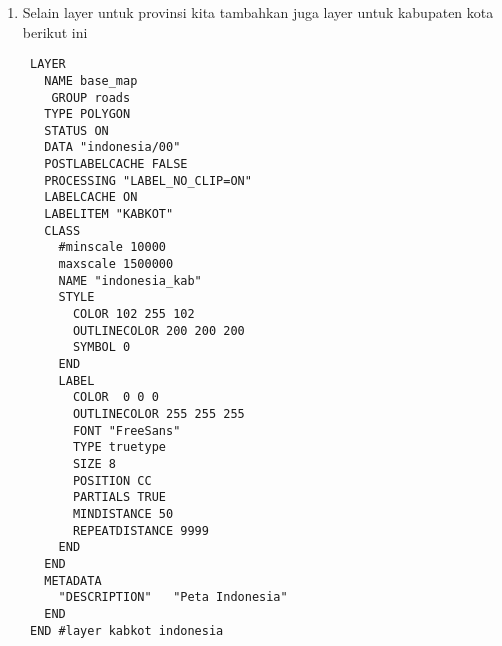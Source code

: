 \begin{enumerate}
\begin{lstlisting}
       OUTLINECOLOR 255 255 255
       FONT "FreeSans"
       TYPE truetype
       SIZE 6
       POSITION lc
       PARTIALS true
       MINDISTANCE 200
     END
   END
   CLASS
     EXPRESSION "SULAWESI TENGGARA"
     STYLE
       COLOR 229 255 204
     END
     LABEL
       COLOR  0 0 0
       OUTLINECOLOR 255 255 255
       FONT "FreeSans"
       TYPE truetype
       SIZE 6
       POSITION lc
       PARTIALS true
       MINDISTANCE 200
     END
   END
   CLASS
     EXPRESSION "GORONTALO"
     STYLE
       COLOR 204 255 229
     END
     LABEL
       COLOR  0 0 0
       OUTLINECOLOR 255 255 255
       FONT "FreeSans"
       TYPE truetype
       SIZE 6
       POSITION lc
       PARTIALS true
       MINDISTANCE 200
     END
   END
   CLASS
     EXPRESSION "SULAWESI BARAT"
     STYLE
       COLOR 153 255 204
     END
     LABEL
       COLOR  0 0 0
       OUTLINECOLOR 255 255 255
       FONT "FreeSans"
       TYPE truetype
       SIZE 6
       POSITION lc
       PARTIALS true
       MINDISTANCE 200
     END
   END
   CLASS
     EXPRESSION "MALUKU"
     STYLE
       COLOR 153 255 153
     END
     LABEL
       COLOR  0 0 0
       OUTLINECOLOR 255 255 255
       FONT "FreeSans"
       TYPE truetype
       SIZE 6
       POSITION lc
       PARTIALS true
       MINDISTANCE 200
     END
   END
   CLASS
     EXPRESSION "MALUKU UTARA"
     STYLE
       COLOR 204 255 204
     END
     LABEL
       COLOR  0 0 0
       OUTLINECOLOR 255 255 255
       FONT "FreeSans"
       TYPE truetype
       SIZE 6
       POSITION lc
       PARTIALS true
       MINDISTANCE 200
     END
   END
   CLASS
     EXPRESSION "PAPUA BARAT"
     STYLE
       COLOR 229 255 204
     END
     LABEL
       COLOR  0 0 0
       OUTLINECOLOR 255 255 255
       FONT "FreeSans"
       TYPE truetype
       SIZE 6
       POSITION lc
       PARTIALS true
       MINDISTANCE 200
     END
   END
   CLASS
     EXPRESSION "PAPUA"
     STYLE
       COLOR 204 255 229
     END
     LABEL
       COLOR  0 0 0
       OUTLINECOLOR 255 255 255
       FONT "FreeSans"
       TYPE truetype
       SIZE 6
       POSITION lc
       PARTIALS true
       MINDISTANCE 200
     END
   END
 END #layer provinsi
\end{lstlisting}

\item Selain layer untuk provinsi kita tambahkan juga layer untuk kabupaten kota berikut ini
\begin{lstlisting}
 LAYER
   NAME base_map
    GROUP roads
   TYPE POLYGON
   STATUS ON
   DATA "indonesia/00"
   POSTLABELCACHE FALSE
   PROCESSING "LABEL_NO_CLIP=ON"
   LABELCACHE ON
   LABELITEM "KABKOT"
   CLASS
     #minscale 10000
     maxscale 1500000
     NAME "indonesia_kab"
     STYLE
       COLOR 102 255 102
       OUTLINECOLOR 200 200 200
       SYMBOL 0
     END
     LABEL
       COLOR  0 0 0
       OUTLINECOLOR 255 255 255
       FONT "FreeSans"
       TYPE truetype
       SIZE 8
       POSITION CC
       PARTIALS TRUE
       MINDISTANCE 50
       REPEATDISTANCE 9999
     END
   END
   METADATA
     "DESCRIPTION"   "Peta Indonesia"
   END
 END #layer kabkot indonesia
\end{lstlisting}
\end{enumerate}

